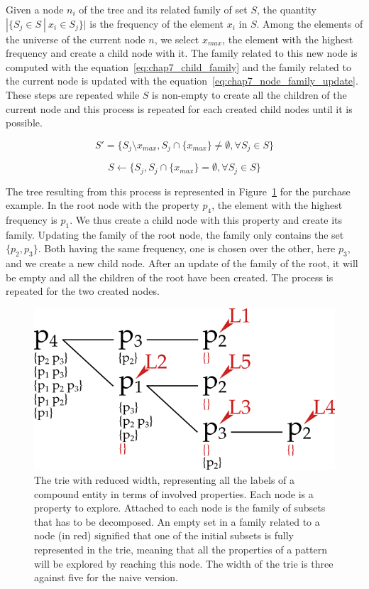Given a node $n_i$ of the tree and its related family of set $S$, the quantity $|\{S_j \in S ~|~ x_i \in S_j \}|$ is the frequency of the element $x_i$ in $S$. Among the elements of the universe of the current node $n$, we select $x_{max}$, the element with the highest frequency and create a child node with it. The family related to this new node is computed with the equation~\eqref{eq:chap7_child_family} and the family related to the current node is updated with the equation~\eqref{eq:chap7_node_family_update}. These steps are repeated while $S$ is non-empty to create all the children of the current node and this process is repeated for each created child nodes until it is possible.

\begin{equation}
S' = \{S_j \setminus x_{max}, S_j \cap \{x_{max}\} \neq \emptyset, \forall S_j \in S\}
\label{eq:chap7_child_family}
\end{equation}

\begin{equation}
S \leftarrow \{S_j, S_j \cap \{x_{max}\} = \emptyset, \forall S_j \in S\}
\label{eq:chap7_node_family_update}
\end{equation}

The tree resulting from this process is represented in Figure~\ref{fig:chap7_advanced} for the purchase example. In the root node with the property $p_4$, the element with the highest frequency is $p_1$. We thus create a child node with this property and create its family. Updating the family of the root node, the family only contains the set $\{p_2, p_3\}$. Both having the same frequency, one is chosen over the other, here $p_3$, and we create a new child node. After an update of the family of the root, it will be empty and all the children of the root have been created. The process is repeated for the two created nodes.

\begin{figure}[ht!]
\centering
\includegraphics[scale=0.45]{figures/chapter7/advanced.png}
\caption{\label{fig:chap7_advanced} The trie with reduced width, representing all the labels of a compound entity in terms of involved properties. Each node is a property to explore. Attached to each node is the family of subsets that has to be decomposed. An empty set in a family related to a node (in red) signified that one of the initial subsets is fully represented in the trie, meaning that all the properties of a pattern will be explored by reaching this node. The width of the trie is three against five for the naive version.}
\end{figure}

